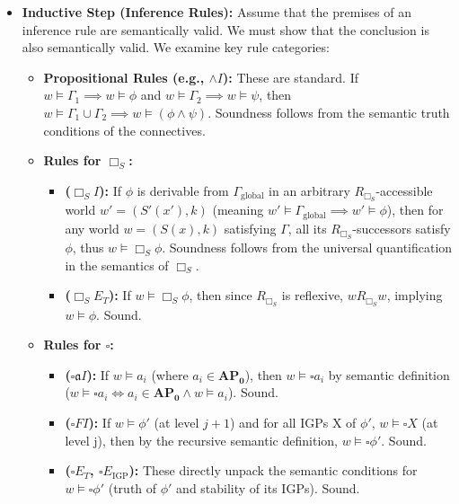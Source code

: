 \documentclass[
    12pt,              %
    a4paper,           %
    headings=normal,   %
    twoside=true,      %
    BCOR=8mm,          %
]{scrbook}
\newcommand{\BoxS}{\Box_S}
\newcommand{\BoxSyn}{\square}
\newcommand{\APZero}{\mathbf{AP_0}}
\begin{document}
\begin{myproof}
\begin{itemize}
    \item   \textbf{Inductive Step (Inference Rules):} Assume that the premises of an inference rule are semantically valid. We must show that the conclusion is also semantically valid. We examine key rule categories:
        \begin{itemize}
            \item   \textbf{Propositional Rules (e.g., \(\land I\)):} These are standard. If \(w \vDash \Gamma_1 \implies w \vDash \phi\) and \(w \vDash \Gamma_2 \implies w \vDash \psi\), then \(w \vDash \Gamma_1 \cup \Gamma_2 \implies w \vDash (\phi \land \psi)\). Soundness follows from the semantic truth conditions of the connectives.
            \item   \textbf{Rules for \(\BoxS\):}
                \begin{itemize}
                    \item   \textbf{(\(\BoxS I\)):} If \(\phi\) is derivable from \(\Gamma_{\text{global}}\) in an arbitrary \(R_{\BoxS}\)-accessible world \(w' = (S'(x'), k)\) (meaning \(w' \vDash \Gamma_{\text{global}} \implies w' \vDash \phi\)), then for any world \(w = (S(x), k)\) satisfying \(\Gamma\), all its \(R_{\BoxS}\)-successors satisfy \(\phi\), thus \(w \vDash \BoxS \phi\). Soundness follows from the universal quantification in the semantics of \(\BoxS\).
                    \item   \textbf{(\(\BoxS E_T\)):} If \(w \vDash \BoxS \phi\), then since \(R_{\BoxS}\) is reflexive, \(wR_{\BoxS}w\), implying \(w \vDash \phi\). Sound.
                \end{itemize}
            \item   \textbf{Rules for \(\BoxSyn\):}
                \begin{itemize}
                    \item   \textbf{(\(\BoxSyn\mathfrak{a}I\)):} If \(w \vDash a_i\) (where \(a_i \in \APZero\)), then \(w \vDash \BoxSyn a_i\) by semantic definition (\(w \vDash \BoxSyn a_i \iff a_i \in \APZero \land w \vDash a_i\)). Sound.
                    \item   \textbf{(\(\BoxSyn FI\)):} If \(w \vDash \phi'\) (at level \(j + 1\)) and for all IGPs X of \(\phi'\), \(w \vDash \BoxSyn X\) (at level j), then by the recursive semantic definition, \(w \vDash \BoxSyn \phi'\). Sound.
                    \item   \textbf{(\(\BoxSyn E_T\), \(\BoxSyn E_{\text{IGP}}\)):} These directly unpack the semantic conditions for \(w \vDash \BoxSyn \phi'\) (truth of \(\phi'\) and stability of its IGPs). Sound.

\end{itemize}
\end{itemize}
\end{itemize}
\end{myproof}
\end{document}
